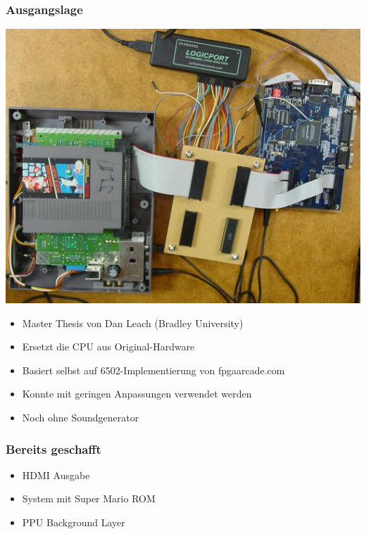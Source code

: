 \documentclass{beamer}
\begin{document}
    \begin{frame}
        \frametitle{Ausgangslage}
                \includegraphics{img/danleach.jpg}
                \begin{itemize}
                    \item{Master Thesis von Dan Leach (Bradley University)}
                    \item{Ersetzt die CPU aus Original-Hardware}
                    \item{Basiert selbst auf 6502-Implementierung von fpgaarcade.com}
                    \item{Konnte mit geringen Anpassungen verwendet werden}
                    \item{Noch ohne Soundgenerator}
                \end{itemize}
    \end{frame}
    
    
    \begin{frame}
        \frametitle{Bereits geschafft}
        \begin{itemize}
            \item{HDMI Ausgabe}
            \item{System mit Super Mario ROM}
            \item{PPU Background Layer}
        \end{itemize}
    \end{frame}
    
\end{document}
